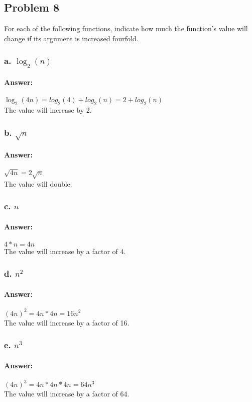 \documentclass{article}
\begin{document}
  \subsection{Problem 8}
        For each of the following functions, indicate how much the function’s value
        will change if its argument is increased fourfold.
    \subsubsection{a. $\log_{2}(n)$}
          \paragraph{Answer:}
              $\log_{2}(4n) = log_{2}(4) + log_2(n) = 2 + log_2(n)$ \\
              The value will increase by 2.
    \subsubsection{b. $\sqrt{n}$}
      \paragraph{Answer:}
          $\sqrt{4n} = 2\sqrt{n}$ \\
          The value will double.
    \subsubsection{c. $n$}
      \paragraph{Answer:}
        $4*n = 4n$ \\
        The value will increase by a factor of 4.
    \subsubsection{d. $n^2$}
      \paragraph{Answer:}
        $(4n)^2 = 4n * 4n = 16n^2$ \\
        The value will increase by a factor of 16.
    \subsubsection{e. $n^3$}
      \paragraph{Answer:}
        $(4n)^3 = 4n * 4n * 4n = 64n^3$ \\
        The value will increase by a factor of 64.
\end{document}
